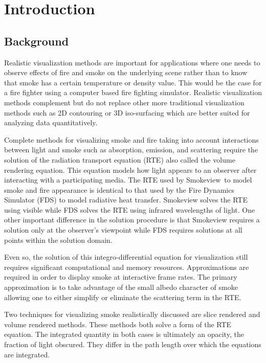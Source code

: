 %
%

\section{Introduction}

\subsection{Background}

Realistic visualization methods are important for applications where one needs to observe effects of fire and smoke on the underlying scene rather than to know that smoke has a certain temperature or density value.  This would be the case for a fire fighter using a computer based fire fighting simulator. Realistic visualization  methods complement but do not replace other more traditional visualization methods such as 2D contouring or 3D iso-surfacing which are better suited for analyzing data quantitatively.

Complete methods for visualizing smoke and fire taking into account interactions between light and smoke such as absorption, emission, and scattering require the solution of the radiation transport equation (RTE)\cite{Siegel:2001} also called the volume rendering equation\cite{levoy:1988}. This equation models how light appears to an observer after interacting with a participating media. The RTE used by Smokeview\citesmv\ to model smoke and fire appearance is identical to that used by the Fire Dynamics Simulator (FDS)\cite{FDS_Tech_Guide} to model radiative heat transfer.  Smokeview solves the RTE using visible while FDS solves the RTE using infrared wavelengths of light. One other important difference in the solution procedure is that Smokeview requires a solution only at the observer's viewpoint while FDS requires solutions at all points within the solution domain.

Even so, the solution of this integro-differential equation for visualization still requires significant computational and memory  resources.  Approximations are required in order to display smoke at interactive frame rates.  The primary approximation is to take advantage of the small albedo character of smoke allowing one to either simplify or eliminate the scattering term in the RTE.

Two techniques for visualizing smoke realistically discussed are slice rendered and volume rendered methods.  These methods both solve a form of the RTE equation.  The integrated quantity in both cases is ultimately an opacity, the fraction of light obscured.  They differ in the path length over which the equations are integrated.

